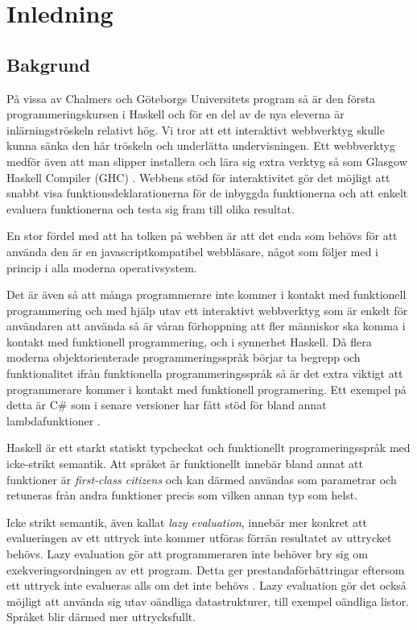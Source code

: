 ﻿\section{Inledning}

\subsection{Bakgrund}
På vissa av Chalmers och Göteborgs Universitets program så är den första programmeringskursen i Haskell \citep{haskell98} och för en del av de nya eleverna är inlärningströskeln relativt hög. Vi tror att ett interaktivt webbverktyg skulle kunna sänka den här tröskeln och underlätta undervisningen. Ett webbverktyg medför även att man slipper installera och lära sig extra verktyg så som Glasgow Haskell Compiler (GHC) \citep{ghc}. Webbens stöd för interaktivitet gör det möjligt att snabbt visa funktionsdeklarationerna för de inbyggda funktionerna och att enkelt evaluera funktionerna och testa sig fram till olika resultat. 

En stor fördel med att ha tolken på webben är att det enda som behövs för att använda den är en javascriptkompatibel webbläsare, något som följer med i princip i alla moderna operativsystem.

Det är även så att många programmerare inte kommer i kontakt med funktionell programmering  och med hjälp utav ett interaktivt webbverktyg som är enkelt för användaren att använda så är våran förhoppning att fler människor ska komma i kontakt med funktionell programmering, och i synnerhet Haskell. Då flera moderna objektorienterade programmeringsspråk börjar ta begrepp och funktionalitet ifrån funktionella programmeringsspråk så är det extra viktigt att programmerare kommer i kontakt med funktionell programering. Ett exempel på detta är C\# som i senare versioner har fått stöd för bland annat lambdafunktioner \citep{csharp}. 


Haskell är ett starkt statiskt typcheckat och funktionellt programeringsspråk med icke-strikt semantik. 
Att språket är funktionellt innebär bland annat att funktioner är \emph{first-class citizens} och kan därmed användas som parametrar och retuneras från andra funktioner precis som vilken annan typ som helst.

Icke strikt semantik, även kallat \emph{lazy evaluation}, innebär mer konkret att evalueringen av ett uttryck inte kommer utföras förrän resultatet av uttrycket behövs.
Lazy evaluation gör att programmeraren inte behöver bry sig om exekveringsordningen av ett program. Detta ger prestandaförbättringar eftersom ett uttryck inte evalueras alls om det inte behövs \citep{hudak89}.
Lazy evaluation gör det också möjligt att använda sig utav oändliga datastrukturer, till exempel oändliga listor. Språket blir därmed mer uttrycksfullt. 

